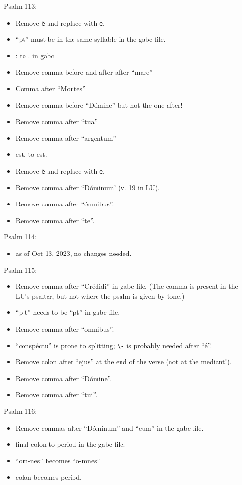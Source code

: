 \documentclass[11pt]{article}
\begin{document}
 Psalm 113:
  \begin{itemize}
   \item Remove \texttt{ë} and replace with \texttt{e}.
    \item ``pt'' must be in the same syllable in the gabc file.
    \item
    : to . in gabc
       \item  Remove comma before and after after ``mare''
       \item
       Comma after ``Montes''
  \item Remove comma before ``Dómine'' but not the one after!
    \item
  Remove comma after ``tua''
  \item
  Remove comma after ``argentum''
  \item
  est, to est.
\item Remove \texttt{ë} and replace with \texttt{e}.
\item Remove comma after ``Dóminum' (v. 19 in LU).
   \item
 Remove comma after ``ómnibus''.
   \item
 Remove comma after ``te''.
 \end{itemize}
 
  Psalm 114:
  \begin{itemize}
  \item as of Oct 13, 2023, no changes needed.
    \end{itemize}
 
 Psalm 115:
 \begin{itemize}
 \item Remove comma after ``Crédidi'' in gabc file. (The comma is present in the LU's psalter, but not where the psalm is given by tone.)
 \item
 ``p-t'' needs to be ``pt'' in gabc file.
    \item  Remove comma after ``omnibus''.
 \item
 ``conspéctu'' is prone to splitting; \verb|\-| is probably needed after ``é''.
   \item
 Remove colon after ``ejus'' at the end of the verse (not at the mediant!).
  \item
 Remove comma after ``Dómine''.
 \item
 Remove comma after ``tui''.
 \end{itemize}
 
    Psalm 116:
  \begin{itemize}
 \item Remove commas after ``Dóminum'' and ``eum'' in the gabc file.
 \item
final colon to period in the gabc file.
 \item
 ``om-nes'' becomes  ``o-mnes''
 \item
 colon becomes period.
\end{itemize}
\end{document}
